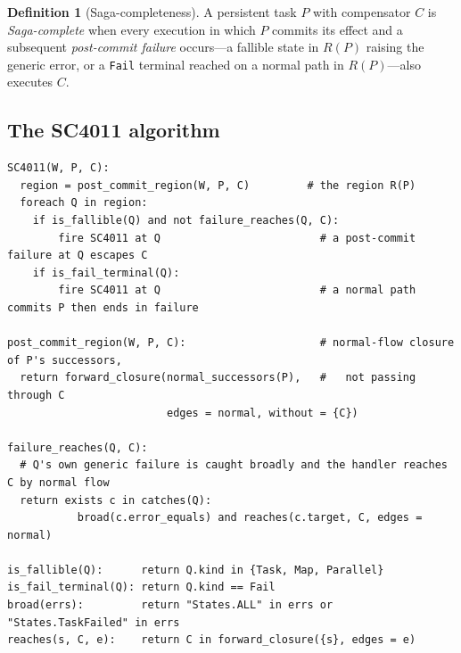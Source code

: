 \documentclass[11pt]{article}
\newcommand{\code}[1]{\textsf{\small #1}}
\theoremstyle{plain}
\theoremstyle{definition}
\newtheorem{definition}{Definition}
\theoremstyle{remark}
\begin{document}
\begin{definition}[Saga-completeness]
A persistent task $P$ with compensator $C$ is \emph{Saga-complete} when every execution in which
$P$ commits its effect and a subsequent \emph{post-commit failure} occurs---a fallible state in
$R(P)$ raising the generic error, or a \texttt{Fail} terminal reached on a normal path in
$R(P)$---also executes $C$.
\end{definition}

\subsection{The \code{SC4011} algorithm}

\begin{lstlisting}[style=pseudo,caption={Downstream-aware Saga check (per persistent task).},label={lst:sc4011}]
SC4011(W, P, C):
  region = post_commit_region(W, P, C)         # the region R(P)
  foreach Q in region:
    if is_fallible(Q) and not failure_reaches(Q, C):
        fire SC4011 at Q                         # a post-commit failure at Q escapes C
    if is_fail_terminal(Q):
        fire SC4011 at Q                         # a normal path commits P then ends in failure

post_commit_region(W, P, C):                     # normal-flow closure of P's successors,
  return forward_closure(normal_successors(P),   #   not passing through C
                         edges = normal, without = {C})

failure_reaches(Q, C):
  # Q's own generic failure is caught broadly and the handler reaches C by normal flow
  return exists c in catches(Q):
           broad(c.error_equals) and reaches(c.target, C, edges = normal)

is_fallible(Q):      return Q.kind in {Task, Map, Parallel}
is_fail_terminal(Q): return Q.kind == Fail
broad(errs):         return "States.ALL" in errs or "States.TaskFailed" in errs
reaches(s, C, e):    return C in forward_closure({s}, edges = e)
\end{lstlisting}
\end{document}
